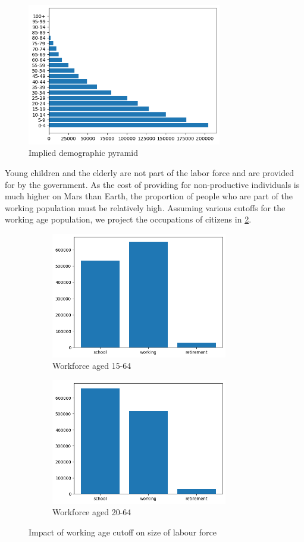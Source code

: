 \documentclass[fleqn,10pt]{Stylesheet} %
\begin{document}
\begin{figure}
    \centering
    \includegraphics[width=85mm]{figures/fig_demopyr_t.png}
    \caption{Implied demographic pyramid}
    \label{fig:demog_total}
\end{figure}

Young children and the elderly are not part of the labor force and are provided for by the government. As the cost of providing for non-productive individuals is much higher on Mars than Earth, the proportion of people who are part of the working population must be relatively high. Assuming various cutoffs for the working age population, we project the occupations of citizens in \ref{fig:workingage}.

\begin{figure}[t!]
    \begin{subfigure}[t]{0.45\textwidth}
        \centering
        \includegraphics[height=55mm]{fig_demo_down.png}
        \caption{Workforce aged 15-64}
    \end{subfigure}
    \qquad \qquad  %
    \begin{subfigure}[t]{0.45\textwidth}
        \centering
        \includegraphics[height=55mm]{fig_demo.png}
        \caption{Workforce aged 20-64}
    \end{subfigure}%
\caption{Impact of working age cutoff on size of labour force}
\label{fig:workingage}
\end{figure}
\end{document}
